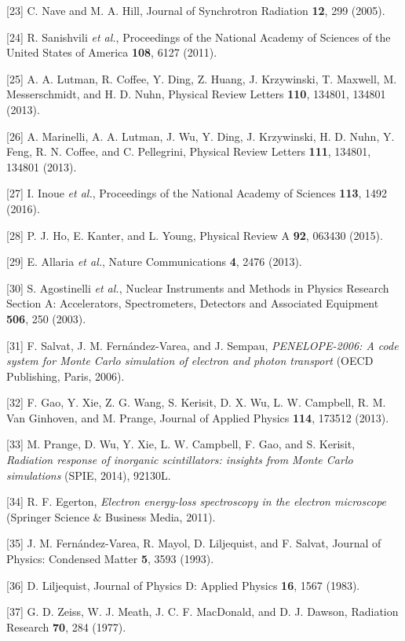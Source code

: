 {[}23{]} C. Nave and M. A. Hill, Journal of Synchrotron Radiation
\textbf{12}, 299 (2005).

{[}24{]} R. Sanishvili \emph{et al.}, Proceedings of the National
Academy of Sciences of the United States of America \textbf{108}, 6127
(2011).

{[}25{]} A. A. Lutman, R. Coffee, Y. Ding, Z. Huang, J. Krzywinski, T.
Maxwell, M. Messerschmidt, and H. D. Nuhn, Physical Review Letters
\textbf{110}, 134801, 134801 (2013).

{[}26{]} A. Marinelli, A. A. Lutman, J. Wu, Y. Ding, J. Krzywinski, H.
D. Nuhn, Y. Feng, R. N. Coffee, and C. Pellegrini, Physical Review
Letters \textbf{111}, 134801, 134801 (2013).

{[}27{]} I. Inoue \emph{et al.}, Proceedings of the National Academy of
Sciences \textbf{113}, 1492 (2016).

{[}28{]} P. J. Ho, E. Kanter, and L. Young, Physical Review A
\textbf{92}, 063430 (2015).

{[}29{]} E. Allaria \emph{et al.}, Nature Communications \textbf{4},
2476 (2013).

{[}30{]} S. Agostinelli \emph{et al.}, Nuclear Instruments and Methods
in Physics Research Section A: Accelerators, Spectrometers, Detectors
and Associated Equipment \textbf{506}, 250 (2003).

{[}31{]} F. Salvat, J. M. Fernández-Varea, and J. Sempau,
\emph{PENELOPE-2006: A code system for Monte Carlo simulation of
electron and photon transport} (OECD Publishing, Paris, 2006).

{[}32{]} F. Gao, Y. Xie, Z. G. Wang, S. Kerisit, D. X. Wu, L. W.
Campbell, R. M. Van Ginhoven, and M. Prange, Journal of Applied Physics
\textbf{114}, 173512 (2013).

{[}33{]} M. Prange, D. Wu, Y. Xie, L. W. Campbell, F. Gao, and S.
Kerisit, \emph{Radiation response of inorganic scintillators: insights
from Monte Carlo simulations} (SPIE, 2014), 92130L.

{[}34{]} R. F. Egerton, \emph{Electron energy-loss spectroscopy in the
electron microscope} (Springer Science \& Business Media, 2011).

{[}35{]} J. M. Fernández-Varea, R. Mayol, D. Liljequist, and F. Salvat,
Journal of Physics: Condensed Matter \textbf{5}, 3593 (1993).

{[}36{]} D. Liljequist, Journal of Physics D: Applied Physics
\textbf{16}, 1567 (1983).

{[}37{]} G. D. Zeiss, W. J. Meath, J. C. F. MacDonald, and D. J. Dawson,
Radiation Research \textbf{70}, 284 (1977).

